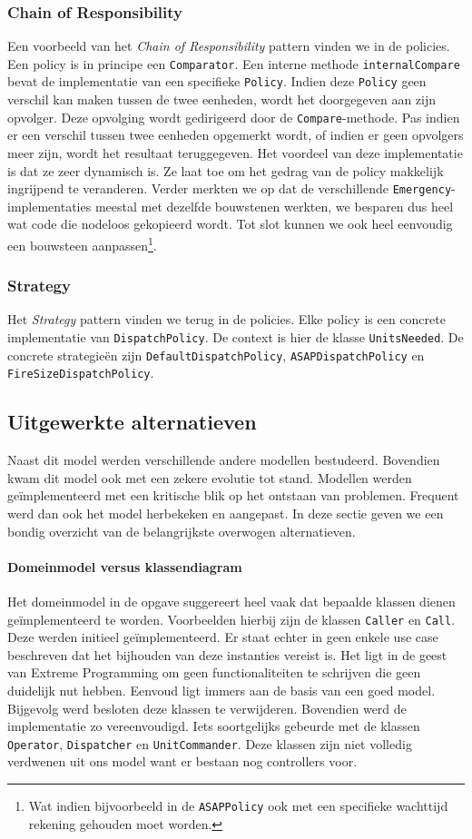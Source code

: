 \subsubsection{Chain of Responsibility}
Een voorbeeld van het \textit{Chain of Responsibility} pattern vinden we in de policies. Een policy is in principe een \texttt{Comparator}. Een interne methode \texttt{internalCompare} bevat de implementatie van een specifieke \texttt{Policy}. Indien deze \texttt{Policy} geen verschil kan maken tussen de twee eenheden, wordt het doorgegeven aan zijn opvolger. Deze opvolging wordt gedirigeerd door de \texttt{Compare}-methode. Pas indien er een verschil tussen twee eenheden opgemerkt wordt, of indien er geen opvolgers meer zijn, wordt het resultaat teruggegeven. Het voordeel van deze implementatie is dat ze zeer dynamisch is. Ze laat toe om het gedrag van de policy makkelijk ingrijpend te veranderen. Verder merkten we op dat de verschillende \texttt{Emergency}-implementaties meestal met dezelfde bouwstenen werkten, we besparen dus heel wat code die nodeloos gekopieerd wordt. Tot slot kunnen we ook heel eenvoudig een bouwsteen aanpassen\footnote{Wat indien bijvoorbeeld in de \texttt{ASAPPolicy} ook met een specifieke wachttijd rekening gehouden moet worden.}.
\subsubsection{Strategy}
Het \textit{Strategy} pattern vinden we terug in de policies. Elke policy is een concrete implementatie van \texttt{DispatchPolicy}. De context is hier de klasse \texttt{UnitsNeeded}. De concrete strategie\"en zijn \texttt{DefaultDispatchPolicy}, \texttt{ASAPDispatchPolicy} en \texttt{FireSizeDispatchPolicy}.
\subsection{Uitgewerkte alternatieven}
Naast dit model werden verschillende andere modellen bestudeerd. Bovendien kwam dit model ook met een zekere evolutie tot stand. Modellen werden ge\"implementeerd met een kritische blik op het ontstaan van problemen. Frequent werd dan ook het model herbekeken en aangepast. In deze sectie geven we een bondig overzicht van de belangrijkste overwogen alternatieven.
\paragraph{Domeinmodel versus klassendiagram}
Het domeinmodel in de opgave suggereert heel vaak dat bepaalde klassen dienen ge\"implementeerd te worden. Voorbeelden hierbij zijn de klassen \texttt{Caller} en \texttt{Call}. Deze werden initieel ge\"implementeerd. Er staat echter in geen enkele use case beschreven dat het bijhouden van deze instanties vereist is. Het ligt in de geest van Extreme Programming om geen functionaliteiten te schrijven die geen duidelijk nut hebben. Eenvoud ligt immers aan de basis van een goed model. Bijgevolg werd besloten deze klassen te verwijderen. Bovendien werd de implementatie zo vereenvoudigd. Iets soortgelijks gebeurde met de klassen \texttt{Operator}, \texttt{Dispatcher} en \texttt{UnitCommander}. Deze klassen zijn niet volledig verdwenen uit ons model want er bestaan nog controllers voor.